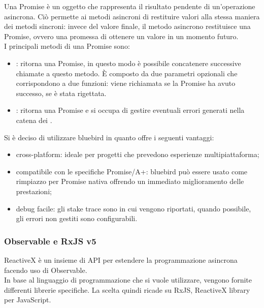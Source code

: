 Una Promise è un oggetto che rappresenta il risultato pendente di un’operazione asincrona. Ciò permette ai metodi asincroni di restituire valori alla stessa maniera dei metodi sincroni:
invece del valore finale, il metodo asincrono restituisce una Promise, ovvero una promessa di ottenere un valore in un momento futuro. \\
I principali metodi di una Promise sono:

\begin{itemize}

\item {}: ritorna una Promise, in questo modo è possibile concatenere successive chiamate a questo metodo. È composto da due parametri opzionali che corrispondono a 
due funzioni:  viene richiamata se la Promise ha avuto successo,  se è stata rigettata.  

\item {}: ritorna una Promise e si occupa di gestire eventuali errori generati nella catena dei .

\end{itemize}
Si è deciso di utilizzare bluebird in quanto offre i seguenti vantaggi:

\begin{itemize}

\item cross-platform: ideale per progetti che prevedono esperienze multipiattaforma;

\item compatibile con le specifiche Promise/A+: bluebird può essere usato come rimpiazzo per Promise nativa offrendo un immediato miglioramento delle prestazioni;

\item debug facile: gli stake trace sono in cui vengono riportati, quando possibile, gli errori non gestiti sono configurabili.

\end{itemize}

\newpage
\subsubsection{Observable e RxJS v5}
ReactiveX è un insieme di API per estendere la programmazione asincrona facendo uso di Observable.\\
In base al linguaggio di programmazione che si vuole utilizzare, vengono fornite differenti librerie specifiche.
La scelta quindi ricade su RxJS, ReactiveX library per JavaScript.


